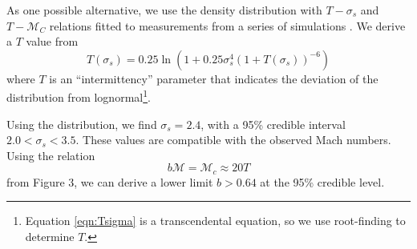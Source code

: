 
As one possible alternative, we use the
\citet{Hopkins2013a} density distribution with $T-\sigma_s$ and $T-\mathcal{M}_C$
relations fitted to measurements from a series of simulations
\citep{Kowal2007a,Kritsuk2007a,Schmidt2009a,Federrath2010a,Federrath2012a,Konstandin2012a,Molina2012a}.
We derive a $T$ value from 
\begin{equation} 
    \label{eqn:Tsigma}
    T(\sigma_s) = 0.25 \ln (1+0.25 \sigma_s^4 \left(1+T(\sigma_s)\right)^{-6})
\end{equation}
where $T$ is an ``intermittency'' parameter that indicates the
deviation of the distribution from lognormal\footnote{Equation \ref{eqn:Tsigma}
is a transcendental equation, so we use root-finding to determine $T$.}.  

Using the \citet{Hopkins2013a} distribution, we find $\sigma_s=2.4$, with
a 95\% credible interval $2.0 < \sigma_s < 3.5$.  These values are
compatible with the observed Mach numbers.  Using the relation 
\begin{equation}
    \label{eqn:McMT}
    b \mathcal{M} = \mathcal{M}_c  \approx 20 T
\end{equation}
from \citet{Hopkins2013a} Figure 3, we can derive a lower limit $b>0.64$ at the
95\% credible level.%


% 
% 
% 

